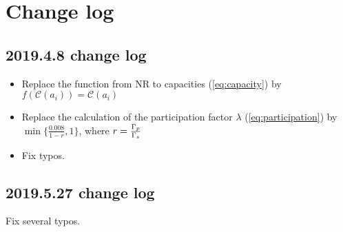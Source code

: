 \section{Change log}
\subsection{2019.4.8 change log}
\begin{itemize}
	\item Replace the function from NR to capacities (\ref{eq:capacity}) by  $f(\mathcal{C}(a_i))=\mathcal{C}(a_i)$
	\item Replace the calculation of the participation factor $\lambda$ (\ref{eq:participation}) by $\min\{\frac{0.008}{1-r},1\}$, where $r=\frac{\Gamma_p}{\Gamma_s}$
	\item Fix typos.
\end{itemize}
\subsection{2019.5.27 change log}
Fix several typos.